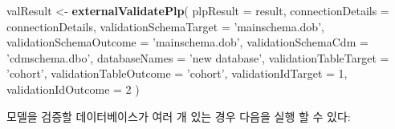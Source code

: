 \documentclass[10.5pt]{book}
\newenvironment{Shaded}{\begin{snugshade}}{\end{snugshade}}
\newcommand{\KeywordTok}[1]{\textcolor[rgb]{0.13,0.29,0.53}{\textbf{#1}}}
\newcommand{\DataTypeTok}[1]{\textcolor[rgb]{0.13,0.29,0.53}{#1}}
\newcommand{\DecValTok}[1]{\textcolor[rgb]{0.00,0.00,0.81}{#1}}
\newcommand{\StringTok}[1]{\textcolor[rgb]{0.31,0.60,0.02}{#1}}
\newcommand{\NormalTok}[1]{#1}
\theoremstyle{definition}
\theoremstyle{definition}
\theoremstyle{definition}
\theoremstyle{remark}
\begin{document}
\begin{Shaded}
\begin{Highlighting}[]
\NormalTok{valResult <-}\StringTok{ }\KeywordTok{externalValidatePlp}\NormalTok{(}
    \DataTypeTok{plpResult =}\NormalTok{ result, }
    \DataTypeTok{connectionDetails =}\NormalTok{ connectionDetails,}
    \DataTypeTok{validationSchemaTarget =} \StringTok{'mainschema.dob'}\NormalTok{,}
    \DataTypeTok{validationSchemaOutcome =} \StringTok{'mainschema.dob'}\NormalTok{,}
    \DataTypeTok{validationSchemaCdm =} \StringTok{'cdmschema.dbo'}\NormalTok{,}
    \DataTypeTok{databaseNames =} \StringTok{'new database'}\NormalTok{,}
    \DataTypeTok{validationTableTarget =} \StringTok{'cohort'}\NormalTok{,}
    \DataTypeTok{validationTableOutcome =} \StringTok{'cohort'}\NormalTok{,}
    \DataTypeTok{validationIdTarget =} \DecValTok{1}\NormalTok{,}
    \DataTypeTok{validationIdOutcome =} \DecValTok{2}
\NormalTok{)}
\end{Highlighting}
\end{Shaded}

모델을 검증할 데이터베이스가 여러 개 있는 경우 다음을 실행 할 수 있다:
\end{document}
